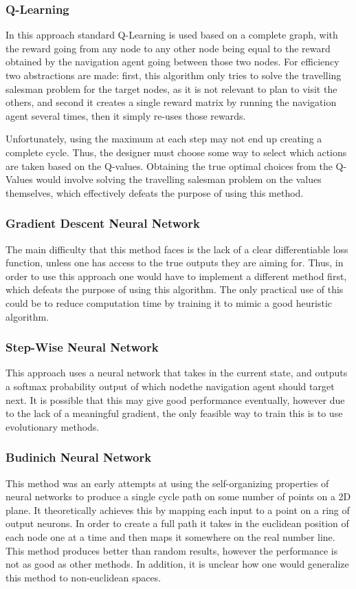 \documentclass{article}
\begin{document}
\subsubsection{Q-Learning}
In this approach standard Q-Learning is used based on a complete graph, with the reward going from any node to any other node being equal to the reward obtained by the navigation agent going between those two nodes. For efficiency two abstractions are made: first, this algorithm only tries to solve the travelling salesman problem for the target nodes, as it is not relevant to plan to visit the others, and second it creates a single reward matrix by running the navigation agent several times, then it simply re-uses those rewards.

Unfortunately, using the maximum at each step may not end up creating a complete cycle. Thus, the designer must choose some way to select which actions are taken based on the Q-values. Obtaining the true optimal choices from the Q-Values would involve solving the travelling salesman problem on the values themselves, which effectively defeats the purpose of using this method.

\subsubsection{Gradient Descent Neural Network}
The main difficulty that this method faces is the lack of a clear differentiable loss function, unless one has access to the true outputs they are aiming for. Thus, in order to use this approach one would have to implement a different method first, which defeats the purpose of using this algorithm. The only practical use of this could be to reduce computation time by training it to mimic a good heuristic algorithm.

\subsubsection{Step-Wise Neural Network}
This approach uses a neural network that takes in the current state, and outputs a softmax probability output of which nodethe navigation agent should target next. It is possible that this may give good performance eventually, however due to the lack of a meaningful gradient, the only feasible way to train this is to use evolutionary methods.

\subsubsection{Budinich Neural Network}
This method was an early attempts at using the self-organizing properties of neural networks to produce a single cycle path on some number of points on a 2D plane. It theoretically achieves this by mapping each input to a point on a ring of output neurons. In order to create a full path it takes in the euclidean position of each node one at a time and then maps it somewhere on the real number line. This method produces better than random results, however the performance is not as good as other methods. In addition, it is unclear how one would generalize this method to non-euclidean spaces.
\end{document}
